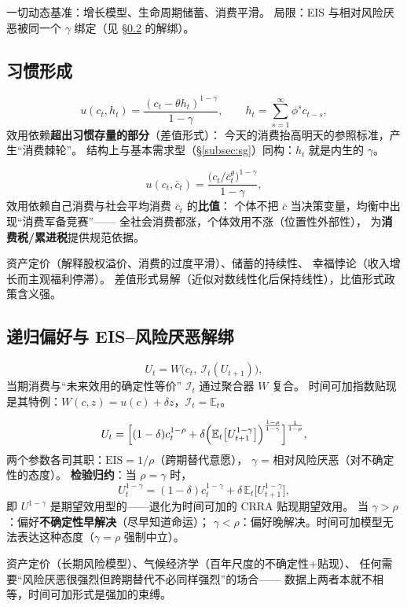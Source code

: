 一切动态基准：增长模型、生命周期储蓄、消费平滑。
局限：EIS 与相对风险厌恶被同一个 $\gamma$ 绑定（见 §\ref{subsec:ez} 的解绑）。

\subsection{习惯形成}\label{subsec:habit}

\[
u(c_t,h_t)=\frac{(c_t-\theta h_t)^{1-\gamma}}{1-\gamma},\qquad
h_t=\sum_{s=1}^{\infty}\phi^{s}c_{t-s},
\]
效用依赖\textbf{超出习惯存量的部分}（差值形式）：
今天的消费抬高明天的参照标准，产生“消费棘轮”。
结构上与基本需求型（§\ref{subsec:sg}）同构：$h_t$ 就是内生的 $\gamma$。

\[
u(c_t,\bar c_t)=\frac{\bigl(c_t/\bar c_t^{\theta}\bigr)^{1-\gamma}}{1-\gamma},
\]
效用依赖自己消费与社会平均消费 $\bar c_t$ 的\textbf{比值}：
个体不把 $\bar c$ 当决策变量，均衡中出现“消费军备竞赛”——
全社会消费都涨，个体效用不涨（位置性外部性），
为\textbf{消费税/累进税}提供规范依据。

资产定价（解释股权溢价、消费的过度平滑）、储蓄的持续性、
幸福悖论（收入增长而主观福利停滞）。
差值形式易解（近似对数线性化后保持线性），比值形式政策含义强。

\subsection{递归偏好与 EIS--风险厌恶解绑}\label{subsec:ez}

\[
U_t=W\bigl(c_t,\ \mathcal{I}_t(U_{t+1})\bigr),
\]
当期消费与“未来效用的确定性等价” $\mathcal{I}_t$ 通过聚合器 $W$ 复合。
时间可加指数贴现是其特例：$W(c,z)=u(c)+\delta z$，$\mathcal{I}_t=\mathbb{E}_t$。

\[
U_t=\Bigl[(1-\delta)c_t^{1-\rho}+\delta\Bigl(\mathbb{E}_t\bigl[U_{t+1}^{1-\gamma}\bigr]\Bigr)^{\frac{1-\rho}{1-\gamma}}\Bigr]^{\frac{1}{1-\rho}},
\]
两个参数各司其职：$\mathrm{EIS}=1/\rho$（跨期替代意愿），
$\gamma$ = 相对风险厌恶（对不确定性的态度）。
\textbf{检验归约}：当 $\rho=\gamma$ 时，
\[
U_t^{1-\gamma}=(1-\delta)c_t^{1-\gamma}+\delta\,\mathbb{E}_t\bigl[U_{t+1}^{1-\gamma}\bigr],
\]
即 $U^{1-\gamma}$ 是期望效用型的——退化为时间可加的 CRRA 贴现期望效用。
当 $\gamma>\rho$：偏好\textbf{不确定性早解决}（尽早知道命运）；
$\gamma<\rho$：偏好晚解决。时间可加模型无法表达这种态度（$\gamma=\rho$ 强制中立）。

资产定价（长期风险模型）、气候经济学（百年尺度的不确定性+贴现）、
任何需要“风险厌恶很强烈但跨期替代不必同样强烈”的场合——
数据上两者本就不相等，时间可加形式是强加的束缚。

